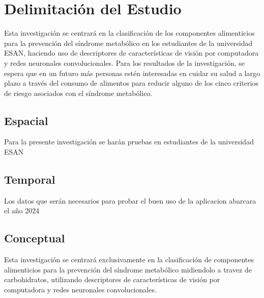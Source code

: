 \section{Delimitación del Estudio}

Esta investigación se centrará en la clasificación de los componentes alimenticios para la prevención del síndrome metabólico en los estudiantes de la universidad ESAN, haciendo uso de descriptores de características de visión por computadora y redes neuronales convolucionales. Para los resultados de la investigación, se espera que en un futuro más personas estén interesadas en cuidar su salud a largo plazo a través del consumo de alimentos para reducir alguno de los cinco criterios de riesgo asociados con el síndrome metabólico.

\subsection{Espacial}
Para la presente investigación se harán pruebas en estudiantes de la universidad ESAN

\subsection{Temporal}
Los datos que serán necesarios para probar el buen uso de la aplicacion abarcara el año 2024

\subsection{Conceptual}
Esta investigación se centrará exclusivamente en la clasificación de componentes alimenticios para la prevención del síndrome metabólico midiendolo a travez de carbohidratos, utilizando descriptores de características de visión por computadora y redes neuronales convolucionales.


